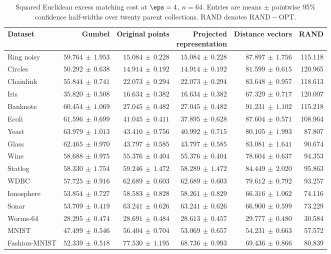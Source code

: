 \begin{table}[p]
\centering\scriptsize
\setlength{\tabcolsep}{3pt}
\caption{Squared Euclidean excess matching cost at $\eps=4$, $n=64$. Entries are means $\pm$ pointwise 95\% confidence half-widths over twenty parent collections. RAND denotes $\mathrm{RAND}-\mathrm{OPT}$.}
\label{tab:exp-bench-p2-eps4}
\begin{tabular}{lrrrrr}
\toprule
Dataset & Gumbel & Original points & \shortstack{Projected\\representation} & Distance vectors & RAND\\
\midrule
Ring noisy & $59.764\,\pm\,1.953$ & $15.084\,\pm\,0.228$ & $15.084\,\pm\,0.228$ & $87.897\,\pm\,1.756$ & 115.118\\
Circles & $50.292\,\pm\,0.638$ & $14.914\,\pm\,0.192$ & $14.914\,\pm\,0.192$ & $81.599\,\pm\,0.615$ & 120.965\\
Chainlink & $55.844\,\pm\,0.741$ & $22.073\,\pm\,0.294$ & $22.073\,\pm\,0.294$ & $83.648\,\pm\,0.957$ & 118.613\\
Iris & $35.820\,\pm\,0.508$ & $16.634\,\pm\,0.382$ & $16.634\,\pm\,0.382$ & $67.329\,\pm\,0.717$ & 120.007\\
Banknote & $60.454\,\pm\,1.069$ & $27.045\,\pm\,0.482$ & $27.045\,\pm\,0.482$ & $91.231\,\pm\,1.102$ & 115.218\\
Ecoli & $61.596\,\pm\,0.699$ & $41.045\,\pm\,0.411$ & $37.895\,\pm\,0.628$ & $87.604\,\pm\,0.571$ & 108.964\\
Yeast & $63.979\,\pm\,1.013$ & $43.410\,\pm\,0.756$ & $40.992\,\pm\,0.715$ & $80.105\,\pm\,1.993$ & 87.807\\
Glass & $62.465\,\pm\,0.970$ & $43.797\,\pm\,0.585$ & $43.797\,\pm\,0.585$ & $83.081\,\pm\,1.641$ & 90.674\\
Wine & $58.688\,\pm\,0.975$ & $55.376\,\pm\,0.404$ & $55.376\,\pm\,0.404$ & $78.604\,\pm\,0.637$ & 94.353\\
Statlog & $58.330\,\pm\,1.754$ & $59.246\,\pm\,1.472$ & $58.289\,\pm\,1.472$ & $84.449\,\pm\,2.020$ & 95.863\\
WDBC & $57.725\,\pm\,0.916$ & $62.689\,\pm\,0.603$ & $62.689\,\pm\,0.603$ & $79.612\,\pm\,0.792$ & 93.257\\
Ionosphere & $53.854\,\pm\,0.727$ & $58.583\,\pm\,0.828$ & $58.261\,\pm\,0.829$ & $66.316\,\pm\,1.062$ & 74.116\\
Sonar & $53.709\,\pm\,0.419$ & $63.241\,\pm\,0.626$ & $63.241\,\pm\,0.626$ & $66.900\,\pm\,0.599$ & 73.229\\
Worms-64 & $28.295\,\pm\,0.474$ & $28.691\,\pm\,0.484$ & $28.613\,\pm\,0.457$ & $29.777\,\pm\,0.480$ & 30.584\\
MNIST & $47.499\,\pm\,0.546$ & $56.404\,\pm\,0.704$ & $53.069\,\pm\,0.657$ & $54.231\,\pm\,0.663$ & 57.572\\
Fashion-MNIST & $52.339\,\pm\,0.518$ & $77.530\,\pm\,1.195$ & $68.736\,\pm\,0.993$ & $69.436\,\pm\,0.866$ & 80.839\\
\bottomrule
\end{tabular}
\end{table}

